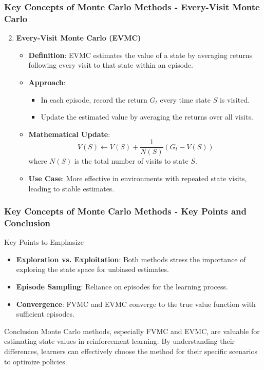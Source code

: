 \documentclass[aspectratio=169]{beamer}
\begin{document}
\begin{frame}[fragile]
    \frametitle{Key Concepts of Monte Carlo Methods - Every-Visit Monte Carlo}
    \begin{enumerate}
        \setcounter{enumi}{1}
        \item \textbf{Every-Visit Monte Carlo (EVMC)}
        \begin{itemize}
            \item \textbf{Definition}: EVMC estimates the value of a state by averaging returns following every visit to that state within an episode.
            \item \textbf{Approach}:
            \begin{itemize}
                \item In each episode, record the return \( G_t \) every time state \( S \) is visited.
                \item Update the estimated value by averaging the returns over all visits.
            \end{itemize}
            \item \textbf{Mathematical Update}:
            \begin{equation}
              V(S) \leftarrow V(S) + \frac{1}{N(S)} \left( G_t - V(S) \right)
            \end{equation}
            where \( N(S) \) is the total number of visits to state \( S \).
            \item \textbf{Use Case}: More effective in environments with repeated state visits, leading to stable estimates.
        \end{itemize}
    \end{enumerate}
\end{frame}

\begin{frame}[fragile]
    \frametitle{Key Concepts of Monte Carlo Methods - Key Points and Conclusion}
    \begin{block}{Key Points to Emphasize}
        \begin{itemize}
            \item \textbf{Exploration vs. Exploitation}: Both methods stress the importance of exploring the state space for unbiased estimates.
            \item \textbf{Episode Sampling}: Reliance on episodes for the learning process.
            \item \textbf{Convergence}: FVMC and EVMC converge to the true value function with sufficient episodes.
        \end{itemize}
    \end{block}

    \begin{block}{Conclusion}
        Monte Carlo methods, especially FVMC and EVMC, are valuable for estimating state values in reinforcement learning. By understanding their differences, learners can effectively choose the method for their specific scenarios to optimize policies.
    \end{block}
\end{frame}
\end{document}
